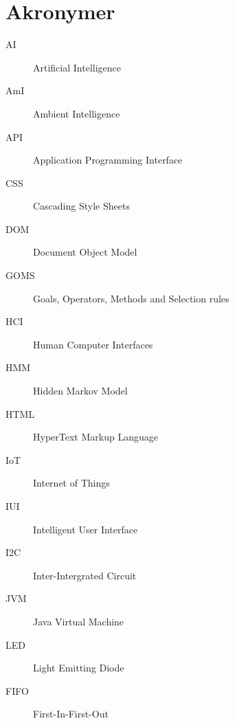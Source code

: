 \section{Akronymer}
\label{akronymer}
\begin{description}
\item[AI] Artificial Intelligence
\item[AmI] Ambient Intelligence
\item[API] Application Programming Interface
\item[CSS] Cascading Style Sheets
\item[DOM] Document Object Model
\item[GOMS] Goals, Operators, Methods and Selection rules
\item[HCI] Human Computer Interfaces
\item[HMM] Hidden Markov Model
\item[HTML] HyperText Markup Language
\item[IoT] Internet of Things
\item[IUI] Intelligent User Interface
\item[I2C] Inter-Intergrated Circuit
\item[JVM] Java Virtual Machine
\item[LED] Light Emitting Diode
\item[FIFO] First-In-First-Out
\end{description}